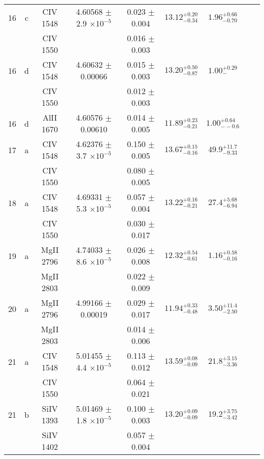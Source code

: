 \documentclass[12pt]{article}
\begin{document}
\begin{footnotesize}
\begin{longtable}{ c c c c c c c c c}
      16  & c  & CIV     1548  &  4.60568 $\pm$ 2.9 $\times 10^{-5}$   &  0.023 $\pm$ 0.004   & $13.12_{ - 0.34}^{ + 0.20}$  & $1.96_{ - 0.70}^{ + 0.66}$    & 	 & \\ 
  &   & CIV     1550  &  &  0.016 $\pm$ 0.003   &   &     & 	 & \\ 
      16  & d  & CIV     1548  &  4.60632 $\pm$ 0.00066  &  0.015 $\pm$ 0.003   & $13.20_{ - 0.87}^{ + 0.50}$  & $1.00_{ -  }^{ + 0.29}$    & 	 & \\ 
  &   & CIV     1550  &  &  0.012 $\pm$ 0.003   &   &     & 	 & \\ 
      16  & d  & AlII     1670  &  4.60576 $\pm$ 0.00610  &  0.014 $\pm$ 0.005   & $11.89_{ - 0.21}^{ + 0.23}$  & $1.00_{ - -0.6}^{ + 0.64}$    & 	 & \\ 
      17  & a  & CIV     1548  &  4.62376 $\pm$ 3.7 $\times 10^{-5}$   &  0.150 $\pm$ 0.005   & $13.67_{ - 0.16}^{ + 0.15}$  & $49.9_{ - 9.33}^{ + 11.7}$    & 	 & \\ 
  &   & CIV     1550  &  &  0.080 $\pm$ 0.005   &   &     & 	 & \\ 
      18  & a  & CIV     1548  &  4.69331 $\pm$ 5.3 $\times 10^{-5}$   &  0.057 $\pm$ 0.004   & $13.22_{ - 0.21}^{ + 0.16}$  & $27.4_{ - 6.94}^{ + 5.68}$    & 	 & \\ 
  &   & CIV     1550  &  &  0.030 $\pm$ 0.017   &   &     & 	 & \\ 
      19  & a  & MgII     2796  &  4.74033 $\pm$ 8.6 $\times 10^{-5}$   &  0.026 $\pm$ 0.008   & $12.32_{ - 0.61}^{ + 0.54}$  & $1.16_{ - 0.16}^{ + 0.58}$    & 	 & \\ 
  &   & MgII     2803  &  &  0.022 $\pm$ 0.009   &   &     & 	 & \\ 
      20  & a  & MgII     2796  &  4.99166 $\pm$ 0.00019  &  0.029 $\pm$ 0.017   & $11.94_{ - 0.48}^{ + 0.33}$  & $3.50_{ - 2.50}^{ + 11.4}$    & 	 & \\ 
  &   & MgII     2803  &  &  0.014 $\pm$ 0.006   &   &     & 	 & \\ 
      21  & a  & CIV     1548  &  5.01455 $\pm$ 4.4 $\times 10^{-5}$   &  0.113 $\pm$ 0.012   & $13.59_{ - 0.09}^{ + 0.08}$  & $21.8_{ - 3.36}^{ + 3.15}$    & 	 & \\ 
  &   & CIV     1550  &  &  0.064 $\pm$ 0.021   &   &     & 	 & \\ 
      21  & b  & SiIV     1393  &  5.01469 $\pm$ 1.8 $\times 10^{-5}$   &  0.100 $\pm$ 0.003   & $13.20_{ - 0.09}^{ + 0.09}$  & $19.2_{ - 3.42}^{ + 3.75}$    & 	 & \\ 
  &   & SiIV     1402  &  &  0.057 $\pm$ 0.004   &   &     & 	 & \\ 

\end{longtable}
\end{footnotesize}
\end{document}
